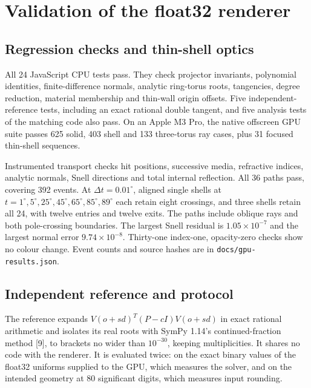 \documentclass[11pt,a4paper]{article}
\begin{document}
\section{Validation of the float32
renderer}\label{validation-of-the-float32-renderer}

\subsection{Regression checks and thin-shell
optics}\label{regression-checks-and-thin-shell-optics}

All 24 JavaScript CPU tests pass. They check projector invariants,
polynomial identities, finite-difference normals, analytic ring-torus
roots, tangencies, degree reduction, material membership and thin-wall
origin offsets. Five independent-reference tests, including an exact
rational double tangent, and five analysis tests of the matching code
also pass. On an Apple M3 Pro, the native offscreen GPU suite passes 625
solid, 403 shell and 133 three-torus ray cases, plus 31 focused
thin-shell sequences.

Instrumented transport checks hit positions, successive media,
refractive indices, analytic normals, Snell directions and total
internal reflection. All 36 paths pass, covering 392 events. At
\(\Delta t=0.01^\circ\), aligned single shells at
\(t=1^\circ,5^\circ,25^\circ,45^\circ,65^\circ,85^\circ,89^\circ\) each
retain eight crossings, and three shells retain all 24, with twelve
entries and twelve exits. The paths include oblique rays and both
pole-crossing boundaries. The largest Snell residual is
\(1.05\times10^{-7}\) and the largest normal error
\(9.74\times10^{-8}\). Thirty-one index-one, opacity-zero checks show no
colour change. Event counts and source hashes are in
\texttt{docs/gpu-results.json}.

\subsection{Independent reference and
protocol}\label{independent-reference-and-protocol}

The reference expands \(V(o+sd)^T(P-cI)V(o+sd)\) in exact rational
arithmetic and isolates its real roots with SymPy 1.14's
continued-fraction method {[}9{]}, to brackets no wider than
\(10^{-30}\), keeping multiplicities. It shares no code with the
renderer. It is evaluated twice: on the exact binary values of the
float32 uniforms supplied to the GPU, which measures the solver, and on
the intended geometry at 80 significant digits, which measures input
rounding.
\end{document}
